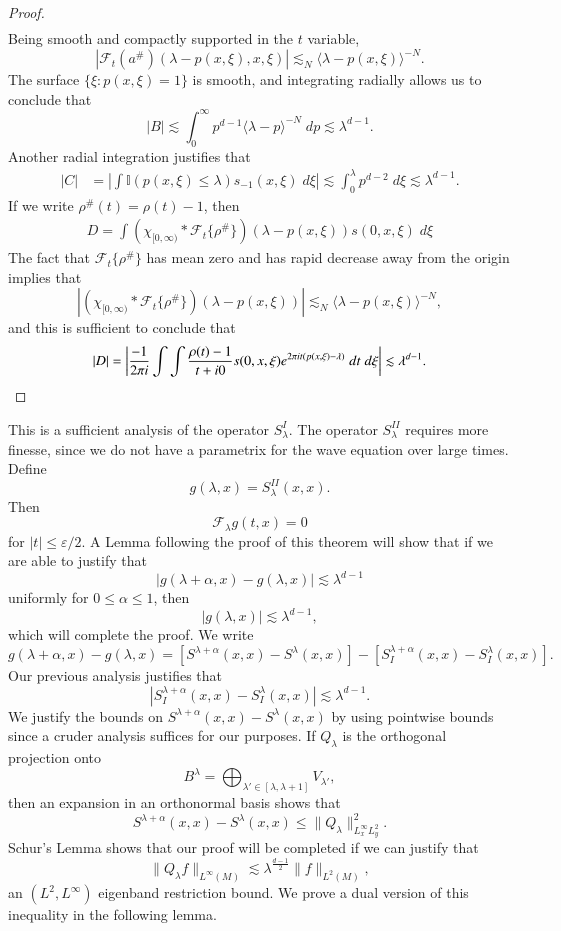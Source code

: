 \begin{proof}
\begin{align*}
    \end{align*}
    Being smooth and compactly supported in the $t$ variable,
    \[ |\mathcal{F}_t(a^\#)(\lambda - p(x,\xi), x, \xi)| \lesssim_N \langle \lambda - p(x,\xi) \rangle^{-N}. \]
    The surface $\{ \xi: p(x,\xi) = 1 \}$ is smooth, and integrating radially allows us to conclude that
    \[ \left| B \right| \lesssim \int_0^\infty p^{d-1} \langle \lambda - p \rangle^{-N}\; dp \lesssim \lambda^{d-1}. \]
    Another radial integration justifies that
    \begin{align*}
        |C| &= \left| \int \mathbb{I}( p(x,\xi) \leq \lambda ) s_{-1}(x,\xi)\; d\xi \right| \lesssim \int_0^\lambda p^{d-2}\; d\xi \lesssim \lambda^{d-1}.
    \end{align*}
    If we write $\rho^\#(t) = \rho(t) - 1$, then
    \begin{align*}
        D = \int ( \chi_{[0,\infty)} * \mathcal{F}_t \{ \rho^\# \} )(\lambda - p(x,\xi)) s(0,x,\xi)\; d \xi
    \end{align*}
    The fact that $\mathcal{F}_t \{ \rho^\# \}$ has mean zero and has rapid decrease away from the origin implies that
    \[ |( \chi_{[0,\infty)} * \mathcal{F}_t \{ \rho^\# \} )(\lambda - p(x,\xi))| \lesssim_N \langle \lambda - p(x,\xi) \rangle^{-N}, \]
    and this is sufficient to conclude that
    \[ |D| = \left| \frac{-1}{2 \pi i} \int \int \frac{\rho(t) - 1}{t + i0} s(0,x,\xi) e^{2 \pi i t ( p(x,\xi) - \lambda)}\; dt\; d\xi \right| \lesssim \lambda^{d-1}. \qedhere \]
\end{proof}

This is a sufficient analysis of the operator $S_\lambda^I$. The operator $S_\lambda^{II}$ requires more finesse, since we do not have a parametrix for the wave equation over large times. Define
%
\[ g(\lambda,x) = S_\lambda^{II}(x,x). \]
%
Then
%
\[ \mathcal{F}_\lambda g(t,x) = 0 \]
%
for $|t| \leq \varepsilon / 2$. A Lemma following the proof of this theorem will show that if we are able to justify that
%
\[ |g(\lambda + \alpha,x) - g(\lambda,x)| \lesssim \lambda^{d-1} \]
%
uniformly for $0 \leq \alpha \leq 1$, then
%
\[ |g(\lambda,x)| \lesssim \lambda^{d-1}, \]
%
which will complete the proof. We write
%
\[ g(\lambda + \alpha,x) - g(\lambda,x) = [ S^{\lambda + \alpha}(x,x) - S^\lambda(x,x) ] - [ S_I^{\lambda + \alpha}(x,x) - S_I^\lambda(x,x) ]. \]
%
Our previous analysis justifies that
%
\[ |S_I^{\lambda + \alpha}(x,x) - S_I^\lambda(x,x)| \lesssim \lambda^{d-1}. \]
%
We justify the bounds on $S^{\lambda + \alpha}(x,x) - S^\lambda(x,x)$ by using pointwise bounds since a cruder analysis suffices for our purposes. If $Q_\lambda$ is the orthogonal projection onto
%
\[ B^\lambda = \bigoplus_{\lambda' \in [\lambda, \lambda + 1]} V_{\lambda'}, \]
%
then an expansion in an orthonormal basis shows that
%
\[ S^{\lambda + \alpha}(x,x) - S^\lambda(x,x) \leq \| Q_\lambda \|_{L^\infty_x L^2_y}^2. \]
%
Schur's Lemma shows that our proof will be completed if we can justify that
%
\[ \| Q_\lambda f \|_{L^\infty(M)} \lesssim \lambda^{\frac{d-1}{2}} \| f \|_{L^2(M)}, \]
%
an $(L^2,L^\infty)$ eigenband restriction bound. We prove a dual version of this inequality in the following lemma.

